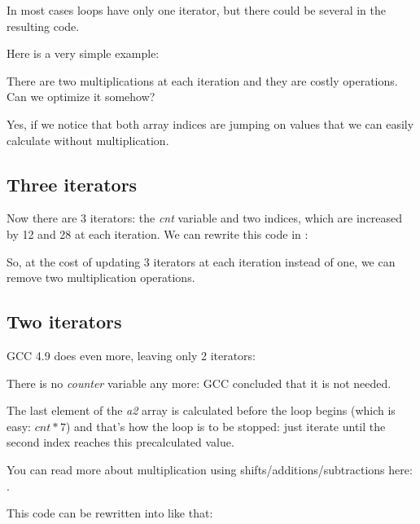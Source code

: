 ﻿
\label{loop_iterators}

In most cases loops have only one iterator, but there could be several in the resulting code.

Here is a very simple example:



There are two multiplications at each iteration and they are costly operations.
Can we optimize it somehow?

Yes, if we notice that both array indices are jumping on values that we can easily calculate without 
multiplication.

\subsection{Three iterators}



Now there are 3 iterators: the \emph{cnt} variable and two indices, which are increased by 12 and 28 at 
each iteration.
We can rewrite this code in \CCpp:



So, at the cost of updating 3 iterators at each iteration instead of one, 
we can remove two multiplication operations.

\subsection{Two iterators}

GCC 4.9 does even more, leaving only 2 iterators:



There is no \emph{counter} variable any more: GCC concluded that it is not needed.

The last element of the \emph{a2} array is calculated before the loop begins (which is easy: $cnt*7$) 
and that's how the loop is to be stopped: just iterate until the second index reaches this precalculated value.

You can read more about multiplication using shifts/additions/subtractions here: 
.

This code can be rewritten into \CCpp like that:

